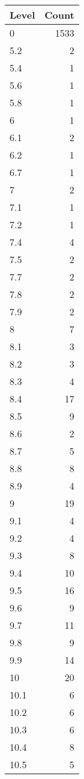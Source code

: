 \begin{table}[ht]
\centering
\begin{tabular}{lr}
  \hline
Level & Count \\ 
  \hline
0 & 1533 \\ 
  5.2 &   2 \\ 
  5.4 &   1 \\ 
  5.6 &   1 \\ 
  5.8 &   1 \\ 
  6 &   1 \\ 
  6.1 &   2 \\ 
  6.2 &   1 \\ 
  6.7 &   1 \\ 
  7 &   2 \\ 
  7.1 &   1 \\ 
  7.2 &   1 \\ 
  7.4 &   4 \\ 
  7.5 &   2 \\ 
  7.7 &   2 \\ 
  7.8 &   2 \\ 
  7.9 &   2 \\ 
  8 &   7 \\ 
  8.1 &   3 \\ 
  8.2 &   3 \\ 
  8.3 &   4 \\ 
  8.4 &  17 \\ 
  8.5 &   9 \\ 
  8.6 &   2 \\ 
  8.7 &   5 \\ 
  8.8 &   8 \\ 
  8.9 &   4 \\ 
  9 &  19 \\ 
  9.1 &   4 \\ 
  9.2 &   4 \\ 
  9.3 &   8 \\ 
  9.4 &  10 \\ 
  9.5 &  16 \\ 
  9.6 &   9 \\ 
  9.7 &  11 \\ 
  9.8 &   9 \\ 
  9.9 &  14 \\ 
  10 &  20 \\ 
  10.1 &   6 \\ 
  10.2 &   6 \\ 
  10.3 &   6 \\ 
  10.4 &   8 \\ 
  10.5 &   5 \\ 

\end{tabular}
\end{table}
